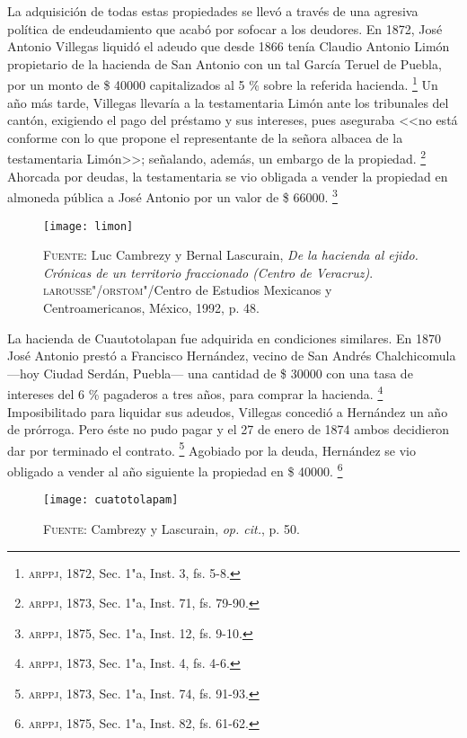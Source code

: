 \documentclass[14pt,twoside,final]{extbook} %
\let\oldfootnote\footnote
\renewcommand\footnote[1]{%
\oldfootnote{\hspace{1mm}#1}}
\begin{document}
La adquisición de todas estas propiedades se llevó a través de una agresiva política de endeudamiento que acabó por sofocar a los deudores. En 1872, José Antonio Villegas liquidó el adeudo que desde 1866 tenía Claudio Antonio Limón propietario de la hacienda de San Antonio con un tal García Teruel de Puebla, por un monto de \$ 40000 capitalizados al 5 \% sobre la referida hacienda.\footnote{\textsc{arppj}, 1872, Sec. 1"a, Inst. 3, fs. 5-8.} Un año más tarde, Villegas llevaría a la testamentaria Limón ante los tribunales del cantón, exigiendo el pago del préstamo y sus intereses, pues aseguraba <<no está conforme con lo que propone el representante de la señora albacea de la testamentaria Limón>>; señalando, además, un embargo de la propiedad.\footnote{\textsc{arppj}, 1873, Sec. 1"a, Inst. 71, fs. 79-90.} Ahorcada por deudas, la testamentaria se vio obligada a vender la propiedad en almoneda pública a José Antonio por un valor de \$ 66000.\footnote{\textsc{arppj}, 1875, Sec. 1"a, Inst. 12, fs. 9-10.}
\begin{sidewaysfigure}
\centering
\texttt{[image: limon]}
\caption[Plano de la hacienda de San Antonio Limón]{\textsc{Fuente:} Luc Cambrezy y Bernal Lascurain, \emph{De la hacienda al ejido. Crónicas de un territorio fraccionado (Centro de Veracruz)}. \textsc{larousse"/orstom}"/Centro de Estudios Mexicanos y Centroamericanos, México, 1992, p. 48.}
\label{fig:hda-limon}
\end{sidewaysfigure}

La hacienda de Cuautotolapan fue adquirida en condiciones similares. En 1870 José Antonio prestó a Francisco Hernández, vecino de San Andrés Chalchicomula ---hoy Ciudad Serdán, Puebla--- una cantidad de \$ 30000 con una tasa de intereses del 6 \% pagaderos a tres años, para comprar la hacienda.\footnote{\textsc{arppj}, 1873, Sec. 1"a, Inst. 4, fs. 4-6.} Imposibilitado para liquidar sus adeudos, Villegas concedió a Hernández un año de prórroga. Pero éste no pudo pagar y el 27 de enero de 1874 ambos decidieron dar por terminado el contrato.\footnote{\textsc{arppj}, 1873, Sec. 1"a, Inst. 74, fs. 91-93.} Agobiado por la deuda, Hernández se vio obligado a vender al año siguiente la propiedad en \$ 40000.\footnote{\textsc{arppj}, 1875, Sec. 1"a, Inst. 82, fs. 61-62.}
\begin{sidewaysfigure}
\centering
\texttt{[image: cuatotolapam]}
\caption[Plano de la hacienda de Cuatotolapam]{\textsc{Fuente:} Cambrezy y Lascurain, \emph{op. cit.}, p. 50.}
\label{fig:hda-cuatotolapam}
\end{sidewaysfigure}
\end{document}

